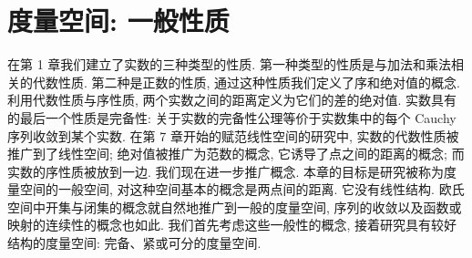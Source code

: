 \documentclass[../main.tex]{subfiles}
\begin{document}
\chapter{度量空间: 一般性质}\label{chapter:ch09-度量空间}

在第 1 章我们建立了实数的三种类型的性质. 第一种类型的性质是与加法和乘法相关的代数性质. 第二种是正数的性质, 通过这种性质我们定义了序和绝对值的概念. 利用代数性质与序性质, 两个实数之间的距离定义为它们的差的绝对值. 实数具有的最后一个性质是完备性: 关于实数的完备性公理等价于实数集中的每个 Cauchy 序列收敛到某个实数. 在第 7 章开始的赋范线性空间的研究中, 实数的代数性质被推广到了线性空间; 绝对值被推广为范数的概念, 它诱导了点之间的距离的概念; 而实数的序性质被放到一边. 我们现在进一步推广概念. 本章的目标是研究被称为度量空间的一般空间, 对这种空间基本的概念是两点间的距离. 它没有线性结构. 欧氏空间中开集与闭集的概念就自然地推广到一般的度量空间, 序列的收敛以及函数或映射的连续性的概念也如此. 我们首先考虑这些一般性的概念, 接着研究具有较好结构的度量空间: 完备、紧或可分的度量空间.










\end{document}
